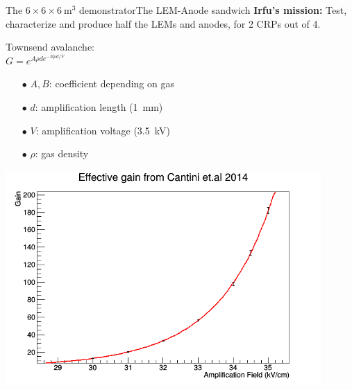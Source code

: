 \documentclass[10pt]{beamer}
\begin{document}
    \begin{frame}{The \texorpdfstring{$6 \times 6 \times \SI{6}{\meter\cubed}$}{666}
    		demonstrator}{The LEM-Anode sandwich}
    	\centering \textbf{Irfu's mission: }Test, characterize and produce  half the LEMs and anodes, for 2 CRPs out of 4.\\\vfill
   		\begin{minipage}{0.48\textwidth}
   			Townsend avalanche:\\
   			\centering  $G = e^{A\rho d e^{-B\rho d/V}}$\\
   			\begin{scriptsize}
    			\begin{itemize}
    				\item[$\bullet$] $A,B$: coefficient depending on gas
    				\item[$\bullet$] $d$: amplification length (\SI{1}{\milli\meter})
    				\item[$\bullet$] $V$: amplification voltage (\SI{3.5}{\kilo\volt})
    				\item[$\bullet$] $\rho$: gas density
    			\end{itemize}
    		\end{scriptsize} 
   			\vfill
			\includegraphics[width=0.9\textwidth]{figures/666/3L_gain.png}
   		\end{minipage}\hfill
   		\begin{minipage}{0.48\textwidth}

\end{minipage}
\end{frame}
\end{document}
